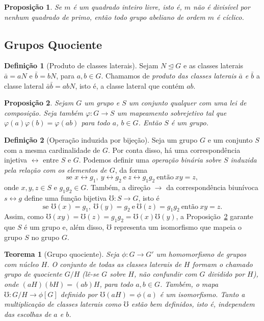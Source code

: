 \documentclass[a4paper,12pt]{report}
\theoremstyle{plain}
\newtheorem{teorema}{Teorema}[section]
\newtheorem{proposicao}{Proposição}[section]
\theoremstyle{definition}
\newtheorem{definicao}{Definição}[section]
\begin{document}
\begin{proposicao}
	Se $m$ é um \emph{quadrado inteiro livre}, isto é, $m$ não é divisível por nenhum quadrado de primo, então todo grupo abeliano de ordem $m$ é cíclico.
\end{proposicao}

\subsection{Grupos Quociente}

\begin{definicao}[Produto de classes laterais] Sejam $N\trianglelefteq G$ e as classes laterais \(\bar a = aN\) e \(\bar b = bN\), para $a,b \in G$. Chamamos de \emph{produto das classes laterais \(\bar a\) e \(\bar b\)} a classe lateral \(\bar a \bar b = abN\), isto é, a classe lateral que contém \(ab\).	
\end{definicao}


\begin{proposicao}\label{prop:grupoInduzidoPorOutro}
	Sejam \(G\) um grupo e \(S\) um conjunto qualquer
	com uma lei de composição. Seja também \(\varphi:G\longrightarrow S\) um
	mapeamento sobrejetivo tal que \(\varphi(a)\varphi(b) = \varphi(ab)\)
	para todo \(a\), \(b\in G\). Então \(S\) é um grupo.	
\end{proposicao}

\begin{definicao}[Operação induzida por bijeção]
	Seja um grupo $G$ e um conjunto $S$ com a mesma cardinalidade de $G$. Por conta disso, há uma correspondência injetiva $\leftrightarrow$ entre $S$ e $G$. Podemos definir uma \emph{operação binária sobre $S$ induzida pela relação com os elementos de $G$}, da forma
	$$\text{se }x\leftrightarrow g_1,\ y\leftrightarrow g_2\ \text{e}\ z\leftrightarrow g_1g_2\ \text{então} \ xy = z,$$ onde $x,y,z\in S$ e $g_1g_2\in G$. Também, a direção $\rightarrow$ da correspondência biunívoca $s\leftrightarrow g$ define uma função bijetiva $\mho: S \longrightarrow G$, isto é
	$$\text{se }\mho(x) = g_1,\ \mho(y) = g_2\ \text{e}\ \mho(z)= g_1g_2\ \text{então} \ xy = z.$$
	Assim, como $\mho(xy) =\mho(z) = g_1g_2 = \mho(x)\mho(y)$, a Proposição~\ref{prop:grupoInduzidoPorOutro} garante que $S$ é um grupo e, além disso, $\mho$ representa um isomorfismo que mapeia o grupo $S$ no grupo $G$.
\end{definicao}

\begin{teorema}[Grupo quociente]
	Seja $\phi: G \longrightarrow G'$ um homomorfismo de grupos com núcleo $H$. O conjunto de todas as classes laterais de $H$ formam o chamado \emph{grupo de quociente} $G/H$ (lê-se $G$ sobre $H$, não confundir com $G$ dividido por $H$), onde $(aH)(bH) = (ab)H$, para todo $a,b \in G$. Também, o mapa $\mho: G/H \longrightarrow \phi[G]$ definido por $\mho(aH) = \phi(a)$ é um isomorfismo. Tanto a multiplicação de classes laterais como $\mho$ estão bem definidos, isto é, independem das escolhas de $a$ e $b$.
\end{teorema}
\end{document}

